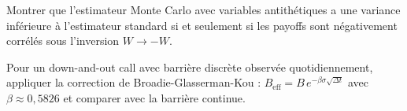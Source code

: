 \begin{exercice}
Montrer que l'estimateur Monte Carlo avec variables antith\'etiques a une
variance inf\'erieure \`a l'estimateur standard si et seulement si les payoffs
sont n\'egativement corr\'el\'es sous l'inversion $W \to -W$.
\end{exercice}

\begin{exercice}
Pour un down-and-out call avec barri\`ere discr\`ete observ\'ee
quotidiennement, appliquer la correction de Broadie-Glasserman-Kou :
$B_{\mathrm{eff}} = B\,e^{-\beta\sigma\sqrt{\Delta t}}$ avec
$\beta \approx 0{,}5826$ et comparer avec la barri\`ere continue.
\end{exercice}
